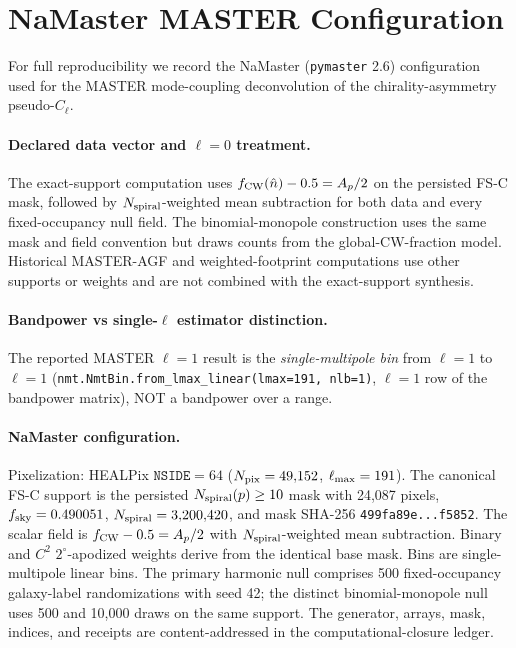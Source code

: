 \documentclass[twocolumn,linenumbers]{aastex702}
\newcommand{\nside}{\texttt{NSIDE}}
\newcommand{\FSC}{\textsc{FS-C}}
\newcommand{\MAGF}{\textsc{MASTER-AGF}}
\begin{document}
\appendix

\section{NaMaster MASTER Configuration}
\label{sec:namaster_config}

For full reproducibility we record the NaMaster (\texttt{pymaster} 2.6) configuration used for the MASTER mode-coupling deconvolution of the chirality-asymmetry pseudo-$C_\ell$.

\paragraph{Declared data vector and $\ell\!=\!0$ treatment.}
The exact-support computation uses $f_{\rm CW}(\hat n)-0.5=A_p/2$ on the persisted \FSC{} mask, followed by $N_{\rm spiral}$-weighted mean subtraction for both data and every fixed-occupancy null field. The binomial-monopole construction uses the same mask and field convention but draws counts from the global-CW-fraction model. Historical \MAGF{} and weighted-footprint computations use other supports or weights and are not combined with the exact-support synthesis.

\paragraph{Bandpower vs single-$\ell$ estimator distinction.}
The reported MASTER $\ell\!=\!1$ result is the \emph{single-multipole bin} from $\ell\!=\!1$ to $\ell\!=\!1$ (\texttt{nmt.NmtBin.from\_lmax\_linear(lmax=191, nlb=1)}, $\ell\!=\!1$ row of the bandpower matrix), NOT a bandpower over a range.

\paragraph{NaMaster configuration.}
Pixelization: HEALPix $\nside=64$ ($N_{\rm pix}=49{,}152$, $\ell_{\rm max}=191$). The canonical \FSC{} support is the persisted $N_{\rm spiral}(p)\geq10$ mask with 24,087 pixels, $f_{\rm sky}=0.490051$, $N_{\rm spiral}=3{,}200{,}420$, and mask SHA-256 \texttt{499fa89e...f5852}. The scalar field is $f_{\rm CW}-0.5=A_p/2$ with $N_{\rm spiral}$-weighted mean subtraction. Binary and $C^2$ $2^\circ$-apodized weights derive from the identical base mask. Bins are single-multipole linear bins. The primary harmonic null comprises 500 fixed-occupancy galaxy-label randomizations with seed 42; the distinct binomial-monopole null uses 500 and 10,000 draws on the same support. The generator, arrays, mask, indices, and receipts are content-addressed in the computational-closure ledger.
\end{document}
